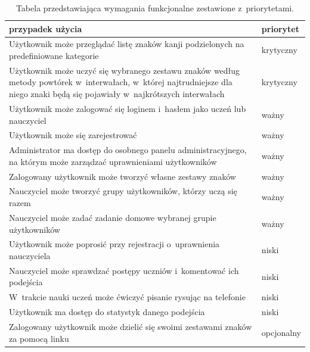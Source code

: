 \documentclass[a4paper,twoside,12pt]{book}
\begin{document}
\begin{table}[] 
\centering
\caption{Tabela przedstawiająca wymagania funkcjonalne zestawione z~priorytetami.}
\label{id:tab:wymagania}
\begin{tabular}{p{}|p{}}
przypadek użycia & priorytet \\ \hline
Użytkownik może przeglądać listę znaków kanji podzielonych na predefiniowane kategorie  &  krytyczny   \\
Użytkownik może uczyć się wybranego zestawu znaków według metody powtórek w~interwałach, w~której najtrudniejsze dla niego znaki będą się pojawiały w~najkrótszych interwałach & krytyczny \\
Użytkownik może zalogować się loginem i~hasłem jako uczeń lub nauczyciel & ważny \\
Użytkownik może się zarejestrować & ważny \\
Administrator ma dostęp do osobnego panelu administracyjnego, na którym może zarządzać uprawnieniami użytkowników & ważny \\
Zalogowany użytkownik może tworzyć własne zestawy znaków & ważny \\
Nauczyciel może tworzyć grupy użytkowników, którzy uczą się razem & ważny \\
Nauczyciel może zadać zadanie domowe wybranej grupie użytkowników & ważny \\
Użytkownik może poprosić przy rejestracji o~uprawnienia nauczyciela & niski \\
Nauczyciel może sprawdzać postępy uczniów i~komentować ich podejścia & niski \\
W~trakcie nauki uczeń może ćwiczyć pisanie rysując na telefonie & niski \\
Użytkownik ma dostęp do statystyk danego podejścia & niski \\
Zalogowany użytkownik może dzielić się swoimi zestawami znaków za pomocą linku & opcjonalny \\
\end{tabular}
\end{table}
\end{document}
